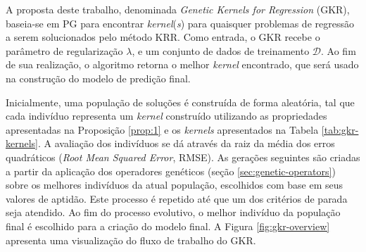 A proposta deste trabalho, denominada \textit{Genetic Kernels for Regression} (GKR), baseia-se em PG para encontrar \textit{kernel}(\textit{s}) para quaisquer problemas de regressão a serem solucionados pelo método KRR. Como entrada, o GKR recebe o parâmetro de regularização $\lambda$, e um conjunto de dados de treinamento $\mathcal{D}$. Ao fim de sua realização, o algoritmo retorna o melhor \textit{kernel} encontrado, que será usado na construção do modelo de predição final.

Inicialmente, uma população de soluções é construída de forma aleatória, tal que cada indivíduo representa um \textit{kernel} construído utilizando as propriedades apresentadas na Proposição \ref{prop:1} e os \textit{kernels} apresentados na Tabela \ref{tab:gkr-kernels}. A avaliação dos indivíduos se dá através da raiz da média dos erros quadráticos (\textit{Root Mean Squared Error}, RMSE). As gerações seguintes são criadas a partir da aplicação dos operadores genéticos (seção \ref{sec:genetic-operators}) sobre os melhores indivíduos da atual população, escolhidos com base em seus valores de aptidão. Este processo é repetido até que um dos critérios de parada seja atendido. Ao fim do processo evolutivo, o melhor indivíduo da população final é escolhido para a criação do modelo final. A Figura \ref{fig:gkr-overview} apresenta uma visualização do fluxo de trabalho do GKR.

